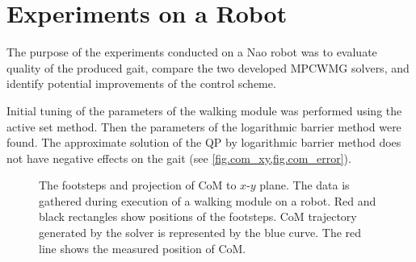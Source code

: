 \section{Experiments on a Robot}
The purpose of the experiments conducted on a Nao robot was to evaluate quality
of the produced gait, compare the two developed \ac{MPCWMG} solvers, and identify
potential improvements of the control scheme.

Initial tuning of the parameters of the walking module was performed using the active
set method. Then the parameters of the logarithmic barrier method were found. The 
approximate solution of the \ac{QP} by logarithmic barrier method does not have
negative effects on the gait (see \cref{fig.com_xy,fig.com_error}).

\begin{figure}[!ht]
    \centering
\caption[Footsteps and projection of {\bf CoM} trajectory to $x\mbox{-}y$ plane]{The 
footsteps and projection of \acs{CoM} to $x\mbox{-}y$ plane. The data is gathered 
during execution of a walking module on a robot. Red and black rectangles show 
positions of the footsteps. \ac{CoM} trajectory generated by the solver is 
represented by the blue curve. The red line shows the measured position of 
\ac{CoM}.}
\label{fig.com_xy}
\end{figure}

